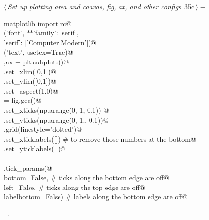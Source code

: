 \documentclass[11.5pt]{report}
\begin{document}
\vspace{-0.8cm}\newchunk 

\begin{flushleft} \small\label{scrap43}\raggedright\small
{} $\langle\,${\itshape Set up plotting area and canvas, fig, ax, and other configs}\nobreak\ {\footnotesize {35c}}$\,\rangle\equiv$
\vspace{-1ex}
\begin{list}{}{} \item
\mbox{}\verb@from matplotlib import rc@\\
\mbox{}\verb@rc('font', **{'family': 'serif', \@\\
\mbox{}\verb@           'serif': ['Computer Modern']})@\\
\mbox{}\verb@rc('text', usetex=True)@\\
\mbox{}\verb@fig,ax = plt.subplots()@\\
\mbox{}\verb@ax.set_xlim([0,1])@\\
\mbox{}\verb@ax.set_ylim([0,1])@\\
\mbox{}\verb@ax.set_aspect(1.0)@\\
\mbox{}\verb@ax = fig.gca()@\\
\mbox{}\verb@ax.set_xticks(np.arange(0, 1, 0.1))     @\\
\mbox{}\verb@ax.set_yticks(np.arange(0, 1., 0.1))@\\
\mbox{}\verb@plt.grid(linestyle='dotted')@\\
\mbox{}\verb@ax.set_xticklabels([]) # to remove those numbers at the bottom@\\
\mbox{}\verb@ax.set_yticklabels([])@\\
\mbox{}\verb@@\\
\mbox{}\verb@ax.tick_params(@\\
\mbox{}\verb@    bottom=False,      # ticks along the bottom edge are off@\\
\mbox{}\verb@    left=False,        # ticks along the top edge are off@\\
\mbox{}\verb@    labelbottom=False) # labels along the bottom edge are off@\\
\mbox{}\verb@@{\NWsep}
\end{list}
\vspace{-1.5ex}
\footnotesize
\begin{list}{}{\setlength{\itemsep}{-\parsep}\setlength{\itemindent}{-\leftmargin}}
\item \NWtxtMacroRefIn\ .

\item{}
\end{list}
\vspace{4ex}
\end{flushleft}
\end{document}
